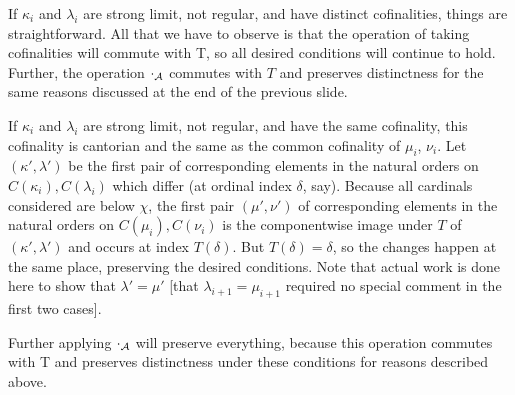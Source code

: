 \documentclass{slides}
\begin{document}
\begin{slide}

If $\kappa_i$ and $\lambda_i$ are strong limit, not regular, and have distinct cofinalities, things are straightforward.  All that we have to observe is that
the operation of taking cofinalities will commute with T, so all desired conditions will continue to hold.  Further, the operation $\cdot_{\cal A}$ commutes with $T$ and preserves distinctness for the same reasons discussed at the end of the previous slide.


\end{slide}

\begin{slide}

If $\kappa_i$ and $\lambda_i$ are strong limit, not regular, and have the same cofinality, this cofinality is cantorian and the same as the common cofinality
of $\mu_i$, $\nu_i$.   Let $(\kappa',\lambda')$ be the first pair of corresponding elements in the natural orders on $C(\kappa_i),C(\lambda_i)$ which differ (at ordinal index $\delta$, say).  Because all cardinals considered are below $\chi$, the first pair $(\mu',\nu')$ of corresponding elements in the natural orders on $C(\mu_i),C(\nu_i)$ is the componentwise image under
$T$ of $(\kappa',\lambda')$  and occurs at index $T(\delta)$.  But $T(\delta) = \delta$, so the changes happen at the same place, preserving the desired conditions.
Note that actual work is done here to show that $\lambda'=\mu'$ [that $\lambda_{i+1}=\mu_{i+1}$ required no special comment in the first two cases].

Further applying $\cdot_{\cal A}$ will preserve everything, because this operation commutes with T and preserves distinctness under these conditions for reasons described above.

\end{slide}
\end{document}
